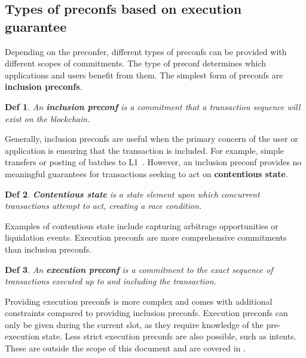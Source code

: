 \documentclass[a4paper]{article}
\theoremstyle{boldstyle}
\newtheorem*{definitionx}{Def}
\newenvironment{definition}
  {\begin{defopenboxq}\begin{definitionx}}
  {\end{definitionx}\end{defopenboxq}}
\begin{document}
    \subsection{Types of preconfs based on execution guarantee}
        Depending on the preconfer, different types of preconfs can be provided with different scopes of commitments. The type of preconf determines which applications and users benefit from them.
        The simplest form of preconfs are \textbf{inclusion preconfs}. 
        \begin{definition}
        An \textbf{inclusion preconf} is a commitment that a transaction sequence will exist on the blockchain. 
        \end{definition}        
        Generally, inclusion preconfs are useful when the primary concern of the user or application is ensuring that the transaction is included. For example, simple transfers or posting of batches to L1~\cite{W:PreconfirmationsforVanillaBasedRollups,W:APricingModelforInclusionPreconfirmations}.  
        However, an inclusion preconf provides no meaningful guarantees for transactions seeking to act on \textbf{contentious state}. 
        \begin{definition}
        \textbf{Contentious state} is a state element upon which concurrent transactions attempt to act, creating a race condition.
        \end{definition}
        Examples of contentious state include capturing arbitrage opportunities or liquidation events.
        Execution preconfs are more comprehensive commitments than inclusion preconfs.
        \begin{definition}
        An \textbf{execution preconf} is a commitment to the exact sequence of transactions executed up to and including the transaction.
        \end{definition}
        Providing execution preconfs is more complex and comes with additional constraints compared to providing inclusion preconfs. Execution preconfs can only be given during the current slot, as they require knowledge of the pre-execution state. 
        Less strict execution preconfs are also possible, such as intents. These are outside the scope of this document and are covered in \cite{W:Intent-BasedArchitectureandTheirRisks, ERC-7521}.
\end{document}
